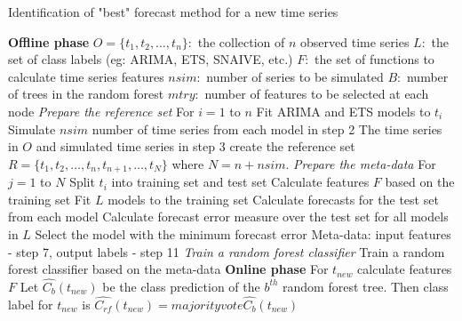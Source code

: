 \documentclass[11pt,a4paper,]{article}
\theoremstyle{definition}
\theoremstyle{definition}
\theoremstyle{definition}
\theoremstyle{remark}
\begin{document}
\begin{algorithm}
  \caption{Identification of "best" forecast method for a new time series}
  \label{alg:algo-lab}
  \begin{algorithmic}[1]
    \Statex \textbf{Offline phase}
    \Statex {}
    \Statex \hspace{1cm}$O=\{t_1, t_2, \dots,t_n\}:$ the collection of $n$ observed time series
      \Statex \hspace{1cm}$L:$ the set of class labels (eg: ARIMA, ETS, SNAIVE, etc.)
         \Statex \hspace{1cm}$F:$ the set of functions to calculate time series features
         \Statex \hspace{1cm}$nsim:$ number of series to be simulated
         \Statex \hspace{1cm}$B:$ number of trees in the random forest
         \Statex \hspace{1cm}$mtry:$ number of features to be selected at each node
     \Statex {}
      \Statex \hspace{1cm} 
      \Statex
     \Statex \textit{Prepare the reference set}
    \Statex For $i=1$ to $n$
    \State Fit ARIMA and ETS models to $t_i$
    \State Simulate $nsim$ number of time series from each model in step 2
    \State The time series in $O$ and simulated time series in step 3 create the reference set $R=\{t_1, t_2, \dots,t_n, t_{n+1},\dots,t_N\}$ where $N = n + nsim$.
    \Statex 
    \Statex \textit{Prepare the meta-data}
    \Statex For $j=1$ to $N$
    \State Split $t_i$ into training set and test set
    \State Calculate features $F$ based on the training set 
    \State Fit $L$ models to the training set
    \State Calculate forecasts for the test set from each model
    \State Calculate forecast error measure over the test set for all models in $L$
    \State Select the model with the minimum forecast error
    \State Meta-data: input features - step 7, output labels - step 11
     \Statex
    \Statex \textit{Train a random forest classifier}
    \State Train a random forest classifier based on the meta-data
    \Statex
     \Statex \textbf{Online phase}
    \Statex {}
    \Statex \hspace{1cm} 
     \Statex {}
      \Statex \hspace{1cm} 
  \State For $t_{new}$ calculate features $F$
  \State Let $\hat{C_b}(t_{new})$ be the class prediction of the $b^{th}$ random forest tree. Then class label for $t_{new}$ is $\hat{C_{rf}}(t_{new})=majorityvote{\hat{C_b}(t_{new})}$
   \end{algorithmic}
\end{algorithm}
\end{document}
